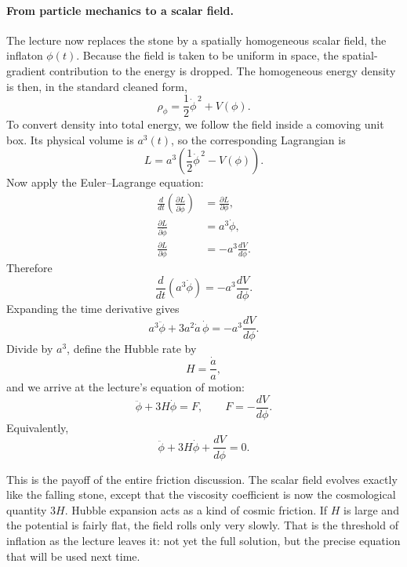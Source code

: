 \paragraph{From particle mechanics to a scalar field.}
The lecture now replaces the stone by a spatially homogeneous scalar field, the inflaton \(\phi(t)\). Because the field is taken to be uniform in space, the spatial-gradient contribution to the energy is dropped. The homogeneous energy density is then, in the standard cleaned form,
\begin{equation}
\rho_\phi=\frac{1}{2}\dot{\phi}^{\,2}+V(\phi).
\end{equation}
To convert density into total energy, we follow the field inside a comoving unit box. Its physical volume is \(a^3(t)\), so the corresponding Lagrangian is
\begin{equation}
L=a^3\!\left(\frac{1}{2}\dot{\phi}^{\,2}-V(\phi)\right).
\end{equation}
Now apply the Euler--Lagrange equation:
\begin{align}
\frac{d}{dt}\left(\frac{\partial L}{\partial \dot{\phi}}\right)&=\frac{\partial L}{\partial \phi},\\
\frac{\partial L}{\partial \dot{\phi}}&=a^3\dot{\phi},\\
\frac{\partial L}{\partial \phi}&=-a^3\frac{dV}{d\phi}.
\end{align}
Therefore
\begin{equation}
\frac{d}{dt}\left(a^3\dot{\phi}\right)=-a^3\frac{dV}{d\phi}.
\end{equation}
Expanding the time derivative gives
\begin{equation}
a^3\ddot{\phi}+3a^2\dot a\,\dot{\phi}=-a^3\frac{dV}{d\phi}.
\end{equation}
Divide by \(a^3\), define the Hubble rate by
\begin{equation}
H=\frac{\dot a}{a},
\end{equation}
and we arrive at the lecture's equation of motion:
\begin{equation}
\ddot{\phi}+3H\dot{\phi}=F,
\qquad
F=-\frac{dV}{d\phi}.
\end{equation}
Equivalently,
\begin{equation}
\ddot{\phi}+3H\dot{\phi}+\frac{dV}{d\phi}=0.
\end{equation}

This is the payoff of the entire friction discussion. The scalar field evolves exactly like the falling stone, except that the viscosity coefficient is now the cosmological quantity \(3H\). Hubble expansion acts as a kind of cosmic friction. If \(H\) is large and the potential is fairly flat, the field rolls only very slowly. That is the threshold of inflation as the lecture leaves it: not yet the full solution, but the precise equation that will be used next time.

